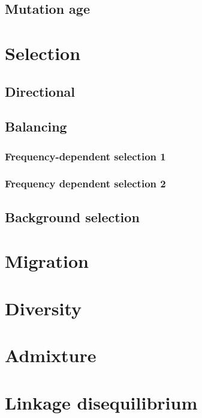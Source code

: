 \documentclass[]{book}
\theoremstyle{definition}
\theoremstyle{definition}
\theoremstyle{definition}
\theoremstyle{remark}
\begin{document}
\section{Mutation age}\label{mutation-age}

\chapter{Selection}\label{selection-1}

\section{Directional}\label{directional}

\section{Balancing}\label{balancing}

\subsection{Frequency-dependent selection
1}\label{frequency-dependent-selection-1}

\subsection{Frequency dependent selection
2}\label{frequency-dependent-selection-2}

\section{Background selection}\label{background-selection}

\chapter{Migration}\label{migration}

\chapter{Diversity}\label{diversity}

\chapter{Admixture}\label{admixture}

\chapter{Linkage disequilibrium}\label{linkage-disequilibrium}
\end{document}
